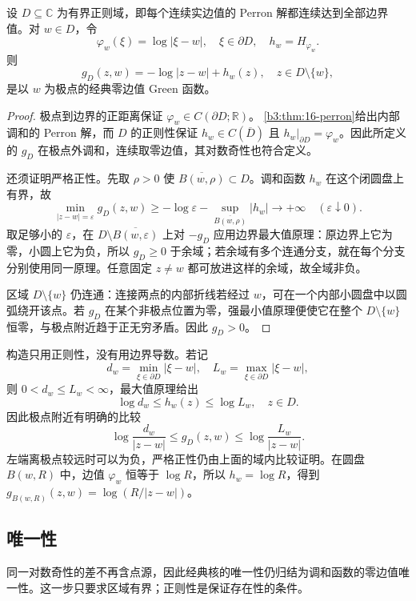 \begin{theorem}\label{b3:thm:17-green-regular}
设 \(D\subseteq\mathbb C\) 为有界正则域，即每个连续实边值的 Perron 解都连续达到全部边界值。对 \(w\in D\)，令
\[
 \varphi_w(\xi)=\log|\xi-w|,\quad \xi\in\partial D,
 \quad h_w=H_{\varphi_w}.
\]
则
\[
 g_D(z,w)=-\log|z-w|+h_w(z),\quad z\in D\setminus\{w\},
\]
是以 \(w\) 为极点的经典零边值 Green 函数。
\end{theorem}
\begin{proof}
极点到边界的正距离保证 \(\varphi_w\in C(\partial D;\mathbb R)\)。
\cref{b3:thm:16-perron}给出内部调和的 Perron 解，而 \(D\) 的正则性保证
\(h_w\in C(\overline D)\) 且 \(h_w|_{\partial D}=\varphi_w\)。因此所定义的
\(g_D\) 在极点外调和，连续取零边值，其对数奇性也符合定义。

还须证明严格正性。先取 \(\rho>0\) 使
\(\overline{B(w,\rho)}\subset D\)。调和函数 \(h_w\) 在这个闭圆盘上有界，故
\[
 \min_{|z-w|=\varepsilon}g_D(z,w)
 \ge-\log\varepsilon-\sup_{\overline{B(w,\rho)}}|h_w|
 \longrightarrow+\infty
 \quad(\varepsilon\downarrow0).
\]
取足够小的 \(\varepsilon\)，在
\(D\setminus\overline{B(w,\varepsilon)}\) 上对 \(-g_D\) 应用边界最大值原理：原边界上它为零，小圆上它为负，所以 \(g_D\ge0\) 于余域；若余域有多个连通分支，就在每个分支分别使用同一原理。任意固定 \(z\ne w\) 都可放进这样的余域，故全域非负。

区域 \(D\setminus\{w\}\) 仍连通：连接两点的内部折线若经过 \(w\)，可在一个内部小圆盘中以圆弧绕开该点。若 \(g_D\) 在某个非极点位置为零，强最小值原理便使它在整个 \(D\setminus\{w\}\) 恒零，与极点附近趋于正无穷矛盾。因此 \(g_D>0\)。
\end{proof}

构造只用正则性，没有用边界导数。若记
\[
 d_w=\min_{\xi\in\partial D}|\xi-w|,\quad
 L_w=\max_{\xi\in\partial D}|\xi-w|,
\]
则 \(0<d_w\le L_w<\infty\)，最大值原理给出
\[
 \log d_w\le h_w(z)\le\log L_w,\quad z\in D.
\]
因此极点附近有明确的比较
\[
 \log\frac{d_w}{|z-w|}
 \le g_D(z,w)\le\log\frac{L_w}{|z-w|}.
\]
左端离极点较远时可以为负，严格正性仍由上面的域内比较证明。在圆盘
\(B(w,R)\) 中，边值 \(\varphi_w\) 恒等于 \(\log R\)，所以
\(h_w=\log R\)，得到 \(g_{B(w,R)}(z,w)=\log(R/|z-w|)\)。

\subsection{唯一性}
\label{b3:subsec:170102}

同一对数奇性的差不再含点源，因此经典核的唯一性仍归结为调和函数的零边值唯一性。这一步只要求区域有界；正则性是保证存在性的条件。

